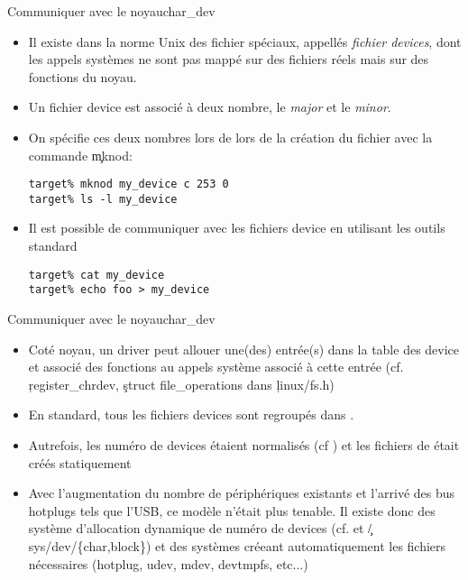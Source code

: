 \begin{frame}[fragile=singleslide]{Communiquer avec le noyau}{char\_dev}
  \begin{itemize} 
  \item Il  existe dans la  norme Unix des fichier  spéciaux, appellés
    \emph{fichier devices}, dont les appels systèmes ne sont pas mappé
    sur des fichiers réels mais sur des fonctions du noyau.
  \item Un fichier  device est associé à deux  nombre, le \emph{major}
    et le \emph{minor}.
  \item On  spécifie ces deux nombres  lors de lors de  la création du
    fichier avec la commande \c{mknod}:
    \begin{lstlisting} 
target% mknod my_device c 253 0
target% ls -l my_device
    \end{lstlisting} 
  \item Il  est possible  de communiquer avec  les fichiers  device en
    utilisant les outils standard
    \begin{lstlisting} 
target% cat my_device
target% echo foo > my_device
    \end{lstlisting} 
  \end{itemize}
\end{frame}

\begin{frame}[fragile=singleslide]{Communiquer avec le noyau}{char\_dev}
  \begin{itemize} 
  \item Coté noyau, un driver  peut allouer une(des) entrée(s) dans la
    table  des  device et  associé  des  fonctions  au appels  système
    associé     à    cette    entrée     (cf.     \c{register_chrdev},
    \c{struct file_operations} dans \c{linux/fs.h})
  \item  En standard, tous  les fichiers  devices sont  regroupés dans
    .
  \item  Autrefois,  les  numéro  de devices  étaient  normalisés  (cf
    )  et les fichiers  de 
    était créés statiquement
  \item Avec  l'augmentation du  nombre de périphériques  existants et
    l'arrivé des bus  hotplugs tels que l'USB, ce  modèle n'était plus
    tenable.  Il existe  donc  des système  d'allocation dynamique  de
    numéro     de      devices     (cf.          et
    \c{/sys/dev/\{char,block\}})     et    des     systèmes    créeant
    automatiquement  les fichiers  nécessaires  (hotplug, udev,  mdev,
    devtmpfs, etc...)
  \end{itemize}
\end{frame}

